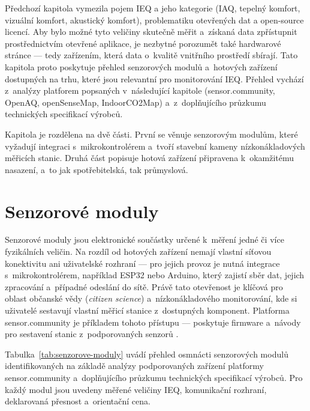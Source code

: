 Předchozí kapitola vymezila pojem IEQ a jeho kategorie (IAQ, tepelný komfort, vizuální komfort, akustický komfort), problematiku otevřených dat a open-source licencí. Aby bylo možné tyto veličiny skutečně měřit a~získaná data zpřístupnit prostřednictvím otevřené aplikace, je nezbytné porozumět také hardwarové stránce --- tedy zařízením, která data o~kvalitě vnitřního prostředí sbírají. Tato kapitola proto poskytuje přehled senzorových modulů a~hotových zařízení dostupných na trhu, které jsou relevantní pro monitorování IEQ. Přehled vychází z~analýzy platforem popsaných v~následující kapitole (sensor.community, OpenAQ, openSenseMap, IndoorCO2Map) a~z~doplňujícího průzkumu technických specifikací výrobců.

Kapitola je rozdělena na dvě části. První se věnuje senzorovým modulům, které vyžadují integraci s~mikrokontrolérem a~tvoří stavební kameny nízkonákladových měřicích stanic. Druhá část popisuje hotová zařízení připravena k~okamžitému nasazení, a~to jak spotřebitelská, tak průmyslová.

\FloatBarrier
\section{Senzorové moduly}
\label{subsec:senzorove-moduly}

Senzorové moduly jsou elektronické součástky určené k~měření jedné či více fyzikálních veličin. Na rozdíl od hotových zařízení nemají vlastní síťovou konektivitu ani uživatelské rozhraní --- pro jejich provoz je nutná integrace s~mikrokontrolérem, například ESP32 nebo Arduino, který zajistí sběr dat, jejich zpracování a~případné odeslání do sítě. Právě tato otevřenost je klíčová pro oblast občanské vědy (\textit{citizen science}) a~nízkonákladového monitorování, kde si uživatelé sestavují vlastní měřicí stanice z~dostupných komponent. Platforma sensor.community je příkladem tohoto přístupu --- poskytuje firmware a~návody pro sestavení stanic z~podporovaných senzorů \parencite{sensor.communitySensorCommunityBuildYour2025}.

Tabulka~\ref{tab:senzorove-moduly} uvádí přehled osmnácti senzorových modulů identifikovaných na základě analýzy podporovaných zařízení platformy sensor.community \parencite{SensorCommunityDevices} a~doplňujícího průzkumu technických specifikací výrobců. Pro každý modul jsou uvedeny měřené veličiny IEQ, komunikační rozhraní, deklarovaná přesnost a~orientační cena.

